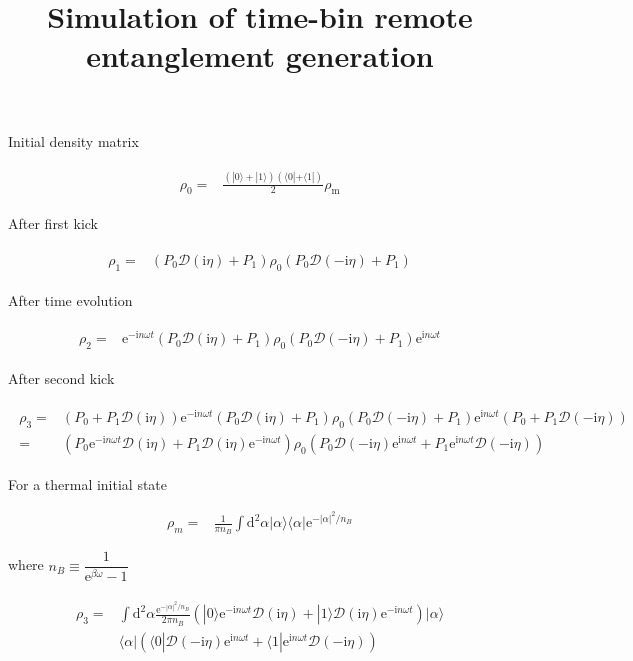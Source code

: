 \documentclass[10pt,fleqn]{article}
\title{Simulation of time-bin remote entanglement generation}
\newcommand{\ud}{\mathrm{d}}
\newcommand{\ue}{\mathrm{e}}
\newcommand{\ui}{\mathrm{i}}
\newcommand{\eqar}[1]
{
  \begin{align}
    #1
  \end{align}
}
\newcommand{\paren}[1]{{\left({#1}\right)}}
\newcommand{\abs}[1]{{\left|{#1}\right|}}
\begin{document}
\maketitle

Initial density matrix
\eqar{
  \begin{split}
    \rho_0=&\frac{\paren{|0\rangle+|1\rangle}\paren{\langle0|+\langle1|}}{2}\rho_{\mathrm{m}}
  \end{split}
}

After first kick
\eqar{
  \begin{split}
    \rho_1=&\paren{P_{0}\mathcal{D}(\ui\eta)+P_{1}}\rho_0\paren{P_{0}\mathcal{D}(-\ui\eta)+P_{1}}
  \end{split}
}

After time evolution
\eqar{
  \begin{split}
    \rho_2=&\ue^{-\ui n\omega t}\paren{P_{0}\mathcal{D}(\ui\eta)+P_{1}}\rho_0\paren{P_{0}\mathcal{D}(-\ui\eta)+P_{1}}\ue^{\ui n\omega t}
  \end{split}
}

After second kick
\eqar{
  \begin{split}
    \rho_3=&\paren{P_{0}+P_{1}\mathcal{D}(\ui\eta)}\ue^{-\ui n\omega t}\paren{P_{0}\mathcal{D}(\ui\eta)+P_{1}}\rho_0\paren{P_{0}\mathcal{D}(-\ui\eta)+P_{1}}\ue^{\ui n\omega t}\paren{P_{0}+P_{1}\mathcal{D}(-\ui\eta)}\\
    =&\paren{P_{0}\ue^{-\ui n\omega t}\mathcal{D}(\ui\eta)+P_{1}\mathcal{D}(\ui\eta)\ue^{-\ui n\omega t}}\rho_0\paren{P_{0}\mathcal{D}(-\ui\eta)\ue^{\ui n\omega t}+P_{1}\ue^{\ui n\omega t}\mathcal{D}(-\ui\eta)}
  \end{split}
}

For a thermal initial state
\eqar{
  \rho_m=&\frac{1}{\pi n_B}\int\ud^2\alpha |\alpha\rangle\langle\alpha|\ue^{-\abs{\alpha}^2/n_B}
}
where $n_B\equiv\dfrac{1}{\ue^{\beta\omega}-1}$
\eqar{
  \begin{split}
    \rho_3=
    &\int\ud^2\alpha \frac{\ue^{-\abs{\alpha}^2/n_B}}{2\pi n_B}
      \paren{|0\rangle\ue^{-\ui n\omega t}\mathcal{D}(\ui\eta)+|1\rangle\mathcal{D}(\ui\eta)\ue^{-\ui n\omega t}}|\alpha\rangle\\
    &\langle\alpha|\paren{\langle0|\mathcal{D}(-\ui\eta)\ue^{\ui n\omega t}+\langle1|\ue^{\ui n\omega t}\mathcal{D}(-\ui\eta)}
  \end{split}
}
\end{document}
